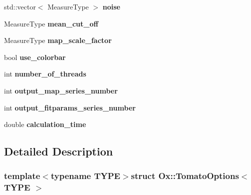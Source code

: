 \begin{DoxyCompactItemize}
\item 
\hypertarget{struct_ox_1_1_tomato_options_ae9352986deb21ca97d4fd34daf564241}{std\-::vector$<$ Measure\-Type $>$ {\bfseries noise}}\label{struct_ox_1_1_tomato_options_ae9352986deb21ca97d4fd34daf564241}

\item 
\hypertarget{struct_ox_1_1_tomato_options_af81d1a55409036109d253b313d59e972}{Measure\-Type {\bfseries mean\-\_\-cut\-\_\-off}}\label{struct_ox_1_1_tomato_options_af81d1a55409036109d253b313d59e972}

\item 
\hypertarget{struct_ox_1_1_tomato_options_ab245e10cf32b36c48d66208a5f505099}{Measure\-Type {\bfseries map\-\_\-scale\-\_\-factor}}\label{struct_ox_1_1_tomato_options_ab245e10cf32b36c48d66208a5f505099}

\item 
\hypertarget{struct_ox_1_1_tomato_options_aa762826a11ff767aa969bd66c29b577f}{bool {\bfseries use\-\_\-colorbar}}\label{struct_ox_1_1_tomato_options_aa762826a11ff767aa969bd66c29b577f}

\item 
\hypertarget{struct_ox_1_1_tomato_options_a54efb4945f2857ee4ed9e1d5552fc3dd}{int {\bfseries number\-\_\-of\-\_\-threads}}\label{struct_ox_1_1_tomato_options_a54efb4945f2857ee4ed9e1d5552fc3dd}

\item 
\hypertarget{struct_ox_1_1_tomato_options_ab20a779c5a8dd371ec9356e3f9ce79c9}{int {\bfseries output\-\_\-map\-\_\-series\-\_\-number}}\label{struct_ox_1_1_tomato_options_ab20a779c5a8dd371ec9356e3f9ce79c9}

\item 
\hypertarget{struct_ox_1_1_tomato_options_a58664e816cde6eff746bd5abe4fe2d1c}{int {\bfseries output\-\_\-fitparams\-\_\-series\-\_\-number}}\label{struct_ox_1_1_tomato_options_a58664e816cde6eff746bd5abe4fe2d1c}

\item 
\hypertarget{struct_ox_1_1_tomato_options_a008c932c7d65248d2d82e0e654993384}{double {\bfseries calculation\-\_\-time}}\label{struct_ox_1_1_tomato_options_a008c932c7d65248d2d82e0e654993384}

\end{DoxyCompactItemize}


\subsection{Detailed Description}
\subsubsection*{template$<$typename T\-Y\-P\-E$>$struct Ox\-::\-Tomato\-Options$<$ T\-Y\-P\-E $>$}

